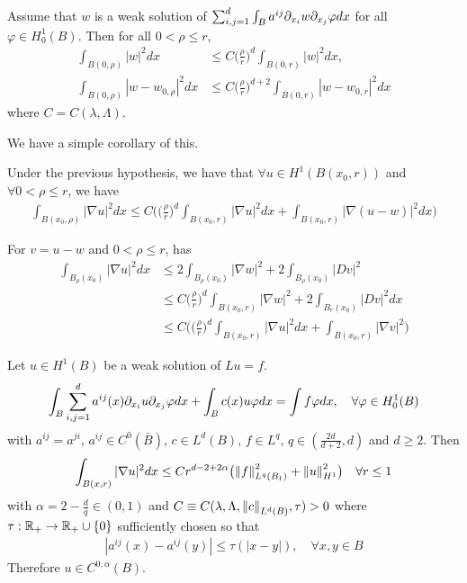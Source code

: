 \documentclass[12pt,a4paper]{article}
\newenvironment{proof}
{\begin{changemargin}{0.5cm}{0.5cm} 
	}%
	{\end{changemargin}
}
\newenvironment{p}
{\begin{proof} 
	}%
	{\end{proof}
}
\begin{document}
\prop Assume that $w$ is a weak solution of $\sum_{i,j=1}^d \int_B a^{ij} \partial_{x_i} w \partial_{x_j} \varphi dx$ for all $\varphi \in H_0^1(B)$. Then for all  $0< \rho \leq r$, 
\begin{align*}
\int_{B(0, \rho)} |w|^2 dx &\leq C\big( \frac{\rho}{r} \big)^d \int_{B(0, r)} |w|^2 dx,\\
\int_{B(0, \rho)} |w - w_{0, \rho}|^2 dx &\leq C \big(\frac{\rho}{r} \big)^{d+2} \int_{B(0,r)} |w- w_{0,r}|^2 dx
\end{align*}
where $C= C(\lambda, \Lambda)$.
\s

We have a simple corollary of this.
\s

\corr Under the previous hypothesis, we have that $\forall u\in H^1(B(x_0, r))$ and $\forall  0< \rho \leq r$, we have
\begin{align*}
\int_{B(x_0, \rho)} |\nabla u|^2 dx \leq C \Big( \big( \frac{\rho}{r}\big)^d \int_{B(x_0, r)} |\nabla u|^2 dx + \int_{B(x_0, r)} |\nabla(u-w)|^2 dx \Big)
\end{align*}
\begin{p}
\pf For $v = u-w$ and $0< \rho \leq r$, has
\begin{align*}
\int_{B_{\rho}(x_0)} |\nabla u|^2 dx & \leq 2\int_{B_{\rho}(x_0)} |\nabla w|^2 + 2 \int_{B_{\rho}(x_0)} |Dv|^2 \\
& \leq C \big( \frac{\rho}{r} \big)^d \int_{B(x_0,r)} |\nabla w|^2 + 2\int_{B_r(x_0)} |Dv|^2 dx \\
& \leq C\Big( \big( \frac{\rho}{r} \big)^d \int_{B(x_0, r)} |\nabla u|^2dx + \int_{B(x_0, r)} |\nabla v|^2 \Big)  
\end{align*}
\eop
\end{p}
\s

\thm Let $u\in H^1(B)$ be a weak solution of $Lu=f$.
\begin{align*}
\int_{B} \sum_{i,j=1}^d a^{ij}(x) \partial_{x_i} u \partial_{x_j} \varphi dx + \int_B c(x) u\varphi dx =\int f\varphi dx, \quad \forall \varphi \in H_0^1 (B)
\end{align*}
with $a^{ij} = a^{ji}$, $a^{ij} \in C^0(\bar{B})$, $c\in L^d (B)$, $f\in L^q$, $q\in (\frac{2d}{d+2}, d)$ and $d\geq 2$. Then
\begin{align*}
\int_{B(x,r)} |\nabla u|^2 dx \leq Cr^{d-2 + 2\alpha}\big( \snorms{f}{L^q(B_1)}^2 + \snorms{u}{H^1}^2 \big) \quad \forall r\leq 1
\end{align*}
with $\alpha = 2- \frac{d}{q} \in (0,1)$ and $C \equiv C(\lambda, \Lambda, \snorms{c}{L^d(B)}, \tau) >0$ where $\tau :\mathbb{R}_+ \rightarrow \mathbb{R}_+ \cup \{0\}$ sufficiently chosen so that
\begin{align*}
|a^{ij}(x) - a^{ij}(y)| \leq \tau(|x-y|), \quad \forall x,y\in B
\end{align*} 
Therefore $u\in C^{0, \alpha}(B)$.
\eos
\s
\end{document}
